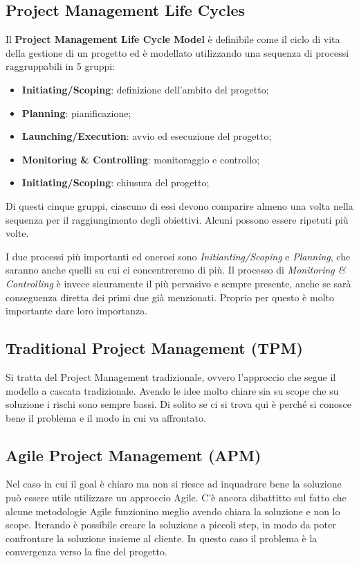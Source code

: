 \subsection{Project Management Life Cycles}
Il \textbf{Project Management Life Cycle Model} è definibile come il ciclo di vita della gestione di un progetto ed è modellato utilizzando una sequenza di processi raggruppabili in 5 gruppi:
\begin{itemize}
	\item \textbf{Initiating/Scoping}: definizione dell'ambito del progetto;
	\item \textbf{Planning}: pianificazione;
	\item \textbf{Launching/Execution}: avvio ed esecuzione del progetto;
	\item \textbf{Monitoring \& Controlling}: monitoraggio e controllo;
	\item \textbf{Initiating/Scoping}: chiusura del progetto;
\end{itemize}
Di questi cinque gruppi, ciascuno di essi devono comparire almeno una volta nella sequenza per il raggiungimento degli obiettivi. Alcuni possono essere ripetuti più volte.
\begin{info}
	I due processi più importanti ed onerosi sono \textit{Initianting/Scoping} e \textit{Planning}, che saranno anche quelli su cui ci concentreremo di più. Il processo di \textit{Monitoring \& Controlling} è invece sicuramente il più pervasivo e sempre presente, anche se sarà conseguenza diretta dei primi due già menzionati. Proprio per questo è molto importante dare loro importanza.
\end{info}
\subsection{Traditional Project Management (TPM)}
Si tratta del Project Management tradizionale, ovvero l'approccio che segue il modello a cascata tradizionale. Avendo le idee molto chiare sia su scope che su soluzione i rischi sono sempre bassi. Di solito se ci si trova qui è perché si conosce bene il problema e il modo in cui va affrontato.
\subsection{Agile Project Management (APM)}
Nel caso in cui il goal è chiaro ma non si riesce ad inquadrare bene la soluzione può essere utile utilizzare un approccio Agile. C'è ancora dibattitto sul fatto che alcune metodologie Agile funzionino meglio avendo chiara la soluzione e non lo scope. Iterando è possibile creare la soluzione a piccoli step, in modo da poter confrontare la soluzione insieme al cliente. In questo caso il problema è la convergenza verso la fine del progetto.
